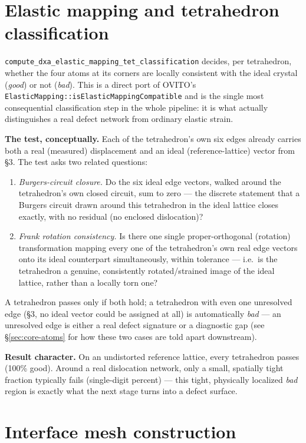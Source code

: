 \documentclass[11pt,a4paper]{article}
\newcommand{\op}[1]{\texttt{#1}}
\newcommand{\code}[1]{\texttt{#1}}
\begin{document}
\section{Elastic mapping and tetrahedron classification}
\label{sec:tetclass}

\op{compute\_dxa\_elastic\_mapping\_tet\_classification} decides, per tetrahedron, whether the four
atoms at its corners are locally consistent with the ideal crystal (\emph{good}) or not
(\emph{bad}). This is a direct port of OVITO's
\code{ElasticMapping::isElasticMappingCompatible} and is the single most consequential
classification step in the whole pipeline: it is what actually distinguishes a real defect
network from ordinary elastic strain.

\textbf{The test, conceptually.} Each of the tetrahedron's own six edges already carries both a
real (measured) displacement and an ideal (reference-lattice) vector from \S 3. The test asks two
related questions:
\begin{enumerate}[nosep]
  \item \emph{Burgers-circuit closure.} Do the six ideal edge vectors, walked around the
    tetrahedron's own closed circuit, sum to zero — the discrete statement that a Burgers circuit
    drawn around this tetrahedron in the ideal lattice closes exactly, with no residual (no
    enclosed dislocation)?
  \item \emph{Frank rotation consistency.} Is there one single proper-orthogonal (rotation)
    transformation mapping every one of the tetrahedron's own real edge vectors onto its ideal
    counterpart simultaneously, within tolerance — i.e.\ is the tetrahedron a genuine, consistently
    rotated/strained image of the ideal lattice, rather than a locally torn one?
\end{enumerate}
A tetrahedron passes only if both hold; a tetrahedron with even one unresolved edge (\S 3, no ideal
vector could be assigned at all) is automatically \emph{bad} — an unresolved edge is either a real
defect signature or a diagnostic gap (see \S\ref{sec:core-atoms} for how these two cases are told
apart downstream).

\textbf{Result character.} On an undistorted reference lattice, every tetrahedron passes (100\%
good). Around a real dislocation network, only a small, spatially tight fraction typically fails
(single-digit percent) — this tight, physically localized \emph{bad} region is exactly what the
next stage turns into a defect surface.

\section{Interface mesh construction}
\label{sec:iface}
\end{document}
